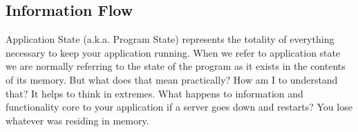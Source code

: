 \documentclass[12pt,twoside]{article}
\begin{document}
\subsection{Information Flow}
Application State (a.k.a. Program State) represents the totality of everything necessary to keep your application running.  When we refer to application state we are normally referring to the state of the program as it exists in the contents of its memory.  But what does that mean practically?  How am I to understand that?  It helps to think in extremes.  What happens to information and functionality core to your application if a server goes down and restarts?  You lose whatever was residing in memory.





\end{document}
